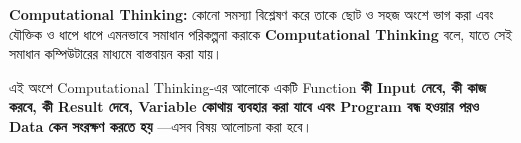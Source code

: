 
\begin{definitionbox}

\textbf{Computational Thinking:}
কোনো সমস্যা বিশ্লেষণ করে তাকে ছোট ও সহজ অংশে ভাগ করা এবং
যৌক্তিক ও ধাপে ধাপে এমনভাবে সমাধান পরিকল্পনা করাকে
\textbf{Computational Thinking} বলে, যাতে সেই সমাধান কম্পিউটারের
মাধ্যমে বাস্তবায়ন করা যায়।

\end{definitionbox}

এই অংশে Computational Thinking-এর আলোকে একটি Function
\textbf{কী Input নেবে, কী কাজ করবে, কী Result দেবে, Variable কোথায়
ব্যবহার করা যাবে এবং Program বন্ধ হওয়ার পরও Data কেন সংরক্ষণ করতে হয়}
—এসব বিষয় আলোচনা করা হবে।


